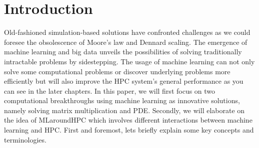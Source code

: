 \documentclass[conference]{IEEEtran}
\begin{document}
\section{Introduction}
Old-fashioned simulation-based solutions have confronted challenges as we could foresee the obsolescence of Moore's law \cite{b1} and Dennard scaling. The emergence of machine learning and big data unveils the possibilities of solving traditionally intractable problems by sidestepping. The usage of machine learning can not only solve some computational problems or discover underlying problems more efficiently but will also improve the HPC system's general performance as you can see in the later chapters. In this paper, we will first focus on two computational breakthroughs using machine learning as innovative solutions, namely solving matrix multiplication and PDE. Secondly, we will elaborate on the idea of MLaroundHPC which involves different interactions between machine learning and HPC. First and foremost, lets briefly explain some key concepts and terminologies.
\end{document}
